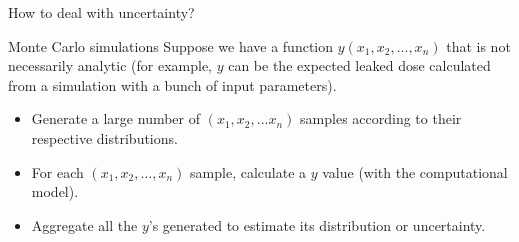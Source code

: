 \documentclass[10pt]{beamer}
\begin{document}
\begin{frame}{How to deal with uncertainty?}
    \end{frame}
    
    \begin{frame}{Monte Carlo simulations}
    	Suppose we have a function $y(x_1,x_2,...,x_n)$ that is not necessarily analytic (for example, $y$ can be the expected leaked dose calculated from a simulation with a bunch of input parameters).\\
        \begin{itemize}
            \item Generate a large number of $(x_1,x_2,...x_n)$ samples according to their respective distributions.
            \item For each $(x_1,x_2,...,x_n)$ sample, calculate a $y$ value (with the computational model).
            \item Aggregate all the $y$'s generated to estimate its distribution or uncertainty.
        \end{itemize}
    \end{frame}
    
\end{document}
